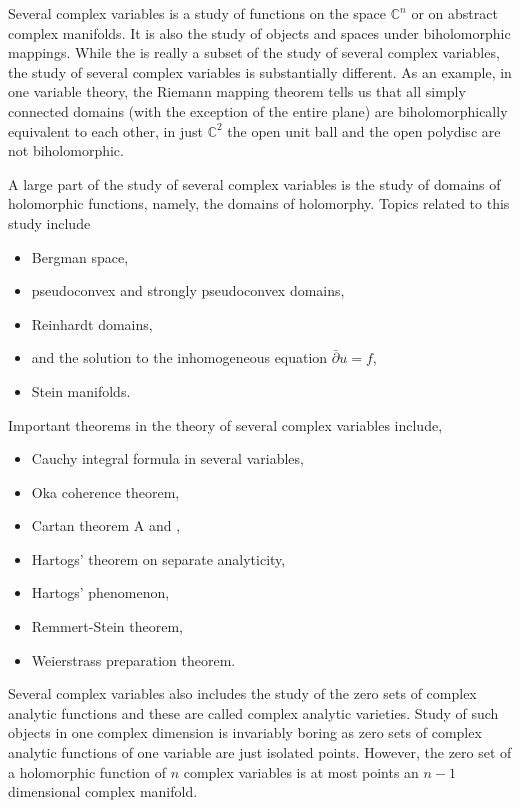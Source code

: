 \documentclass[12pt]{article}
\theoremstyle{theorem}
\theoremstyle{definition}
\theoremstyle{remark}
\begin{document}
Several complex variables is a study of  functions on the space ${\mathbb{C}}^n$ or on abstract complex manifolds.  It is also the study of objects and spaces under biholomorphic mappings.  While the 
 is really a subset of the study of several complex variables, the study of several complex variables is substantially different.  As an example, in one variable theory, the Riemann mapping theorem tells us that all simply connected domains (with the exception of the entire plane) are biholomorphically equivalent to each other, in just ${\mathbb{C}}^2$ the open unit ball and the open polydisc are not
biholomorphic.

A large part of the study of several complex variables is the study of domains of holomorphic functions, namely, the domains of holomorphy.  Topics related to this study include
\begin{itemize}
\item Bergman space,
\item pseudoconvex and strongly pseudoconvex domains,
\item Reinhardt domains,
\item {} and the solution to the inhomogeneous equation $\bar{\partial} u = f$,
\item Stein manifolds.
\end{itemize}

Important theorems in the theory of several complex variables include,
\begin{itemize}
\item Cauchy integral formula in several variables,
\item Oka coherence theorem,
\item Cartan theorem A and ,
\item Hartogs' theorem on separate analyticity,
\item Hartogs' phenomenon,
\item Remmert-Stein theorem,
\item Weierstrass preparation theorem.
\end{itemize}

Several complex variables also includes the study of the zero sets of complex analytic functions and these are called complex analytic varieties.  Study of such objects in one complex dimension is invariably boring as zero sets of complex analytic functions of one variable are just isolated points.  However,
the zero set of a holomorphic function of $n$ complex variables is at most points an $n-1$
dimensional complex manifold.
\end{document}
